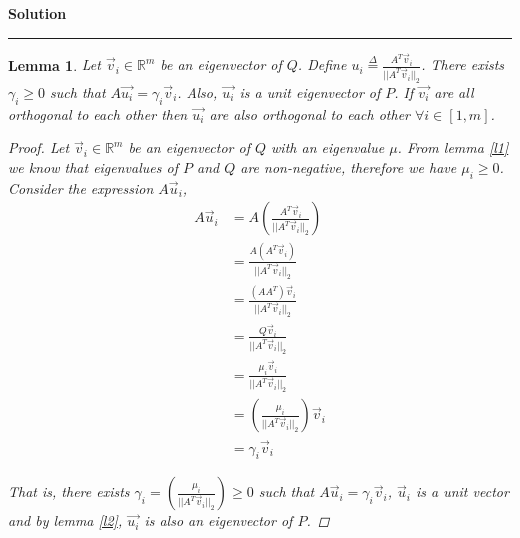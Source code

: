 \documentclass[a4paper,12pt]{article}
\newenvironment{solution}[2][]{%
    \begin{mdframed}[linecolor=blue!70!black, linewidth=2pt, roundcorner=10pt, backgroundcolor=yellow!10!white, skipabove=12pt, skipbelow=12pt]%
        \textbf{\large #2}
        \par\noindent\rule{\textwidth}{0.4pt}
}{
    \end{mdframed}
}
\newtheorem{lemma}{Lemma}
\begin{document}
\begin{solution}{Solution}
        \begin{lemma}\label{l3}
          Let $\vec{v}_{i} \in \mathbb{R}^{m}$ be an eigenvector of $Q$. Define 
          $u_{i} \stackrel{\Delta}{=} \frac{A^{T} \vec{v}_{i}}{\lvert\lvert A^{T} \vec{v}_{i} \rvert\rvert_{2}}$. There exists 
          $\gamma_{i} \geqslant 0$ such that $A\vec{u_{i}} = \gamma_{i} \vec{v}_{i}$. Also, $\vec{u_{i}}$ is a unit eigenvector of $P$.
          If $\vec{v_{i}}$ are all orthogonal to each other then $\vec{u_{i}}$ are also orthogonal to each other $\forall i \in [1,m]$.
          \begin{proof} 
            Let $\vec{v}_{i} \in \mathbb{R}^{m}$ be an eigenvector of $Q$ with an eigenvalue $\mu$. From lemma \@\ref{l1} we know that eigenvalues of $P$ and $Q$ are non-negative, therefore we have 
            $\mu_{i} \geqslant 0$.
            Consider the expression $A\vec{u}_{i}$,
            \begin{align}
               A\vec{u}_{i} &= A \left(\frac{A^{T} \vec{v}_{i}}{\lvert\lvert A^{T} \vec{v}_{i} \rvert\rvert_{2}}\right) \nonumber \\
                            &= \frac{ A (A^{T} \vec{v}_{i})}{\lvert\lvert A^{T} \vec{v}_{i} \rvert\rvert_{2}} \nonumber \\
                            &= \frac{ (A A^{T}) \vec{v}_{i}}{\lvert\lvert A^{T} \vec{v}_{i} \rvert\rvert_{2}} \nonumber \\
                            &= \frac{Q\vec{v}_{i}}{\lvert\lvert A^{T} \vec{v}_{i} \rvert\rvert_{2}} \nonumber \\
                            &= \frac{\mu_{i}\vec{v}_{i}}{\lvert\lvert A^{T} \vec{v}_{i} \rvert\rvert_{2}} \nonumber \\
                            &= \left(\frac{\mu_{i}}{\lvert\lvert A^{T} \vec{v}_{i} \rvert\rvert_{2}}\right) \vec{v}_{i} \nonumber \\
                            &= \gamma_{i} \vec{v}_{i}
            \end{align}

            That is, there exists 
            $\gamma_{i} = \left(\frac{\mu_{i}}{\lvert\lvert A^{T} \vec{v}_{i} \rvert\rvert_{2}}\right) \geqslant 0$ 
            such that $A\vec{u}_{i} = \gamma_{i} \vec{v}_{i}$, $\vec{u}_{i}$ is a unit vector and by lemma \@\ref{l2}, $\vec{u_{i}}$ is also an eigenvector of $P$.
            

\end{proof}
\end{lemma}
\end{solution}
\end{document}
